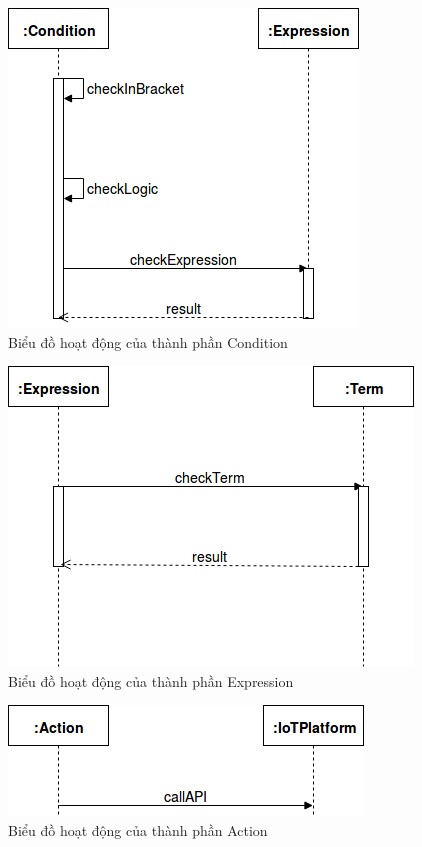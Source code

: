 \begin{figure}[h!]
	\center
	\includegraphics[scale=0.4]{image/language_diagram-condition}	
	\caption{Biểu đồ hoạt động của thành phần Condition}
\end{figure}


\begin{figure}[h!]
	\center
	\includegraphics[scale=0.4]{image/language_diagram-expression}	
	\caption{Biểu đồ hoạt động của thành phần Expression}
\end{figure}


\begin{figure}[h!]
	\center
	\includegraphics[scale=0.4]{image/language_diagram-action}	
	\caption{Biểu đồ hoạt động của thành phần Action}
\end{figure}


